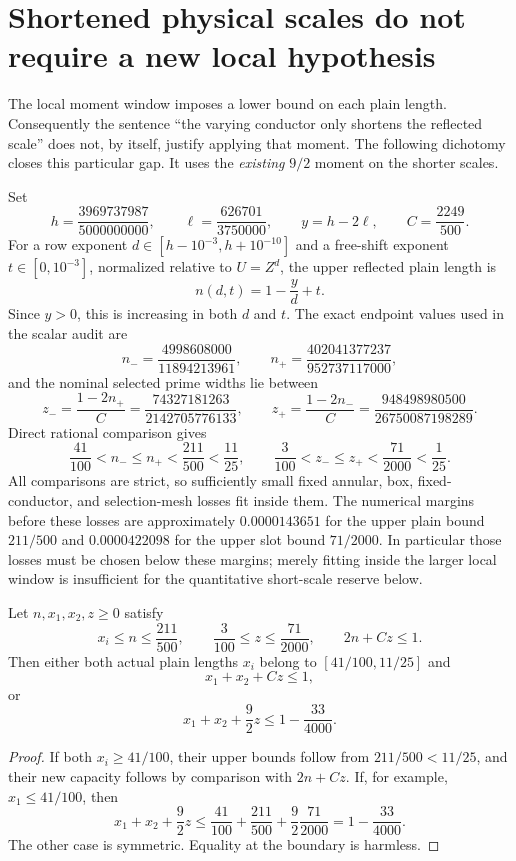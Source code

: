 \section{Shortened physical scales do not require a new local hypothesis}
\label{sec:physical-scale-shortening}

The local moment window imposes a lower bound on each plain length.
Consequently the sentence ``the varying conductor only shortens the
reflected scale'' does not, by itself, justify applying that moment.
The following dichotomy closes this particular gap. It uses the
\emph{existing} $9/2$ moment on the shorter scales.

Set
\[
 h=\frac{3969737987}{5000000000},\qquad
 \ell=\frac{626701}{3750000},\qquad y=h-2\ell,
 \qquad C=\frac{2249}{500}.
\]
For a row exponent $d\in[h-10^{-3},h+10^{-10}]$ and a free-shift
exponent $t\in[0,10^{-3}]$, normalized relative to $U=Z^d$, the
upper reflected plain length is
\[
 n(d,t)=1-\frac yd+t.
\]
Since $y>0$, this is increasing in both $d$ and $t$. The exact
endpoint values used in the scalar audit are
\[
 n_- =\frac{4998608000}{11894213961},\qquad
 n_+ =\frac{402041377237}{952737117000},
\]
and the nominal selected prime widths lie between
\[
 z_- =\frac{1-2n_+}{C}
      =\frac{74327181263}{2142705776133},\qquad
 z_+ =\frac{1-2n_-}{C}
      =\frac{948498980500}{26750087198289}.
\]
Direct rational comparison gives
\[
 \frac{41}{100}<n_-\le n_+<\frac{211}{500}<\frac{11}{25},
 \qquad
 \frac3{100}<z_-\le z_+<\frac{71}{2000}<\frac1{25}.
\]
All comparisons are strict, so sufficiently small fixed annular,
box, fixed-conductor, and selection-mesh losses fit inside them.
The numerical margins before these losses are approximately
$0.0000143651$ for the upper plain bound $211/500$ and
$0.0000422098$ for the upper slot bound $71/2000$.
In particular those losses must be chosen below these margins;
merely fitting inside the larger local window is insufficient for
the quantitative short-scale reserve below.

\begin{lemma}
Let $n,x_1,x_2,z\ge0$ satisfy
\[
 x_i\le n\le\frac{211}{500},\qquad
 \frac3{100}\le z\le\frac{71}{2000},\qquad
 2n+Cz\le1.
\]
Then either both actual plain lengths $x_i$ belong to
$[41/100,11/25]$ and
\[
 x_1+x_2+Cz\le1,
\]
or
\[
 x_1+x_2+\frac92z\le1-\frac{33}{4000}.
\]
\end{lemma}
\begin{proof}
If both $x_i\ge41/100$, their upper bounds follow from
$211/500<11/25$, and their new capacity follows by comparison
with $2n+Cz$.
If, for example, $x_1\le41/100$, then
\[
 x_1+x_2+\frac92z
 \le\frac{41}{100}+\frac{211}{500}
       +\frac92\frac{71}{2000}
 =1-\frac{33}{4000}.
\]
The other case is symmetric. Equality at the boundary is harmless.
\end{proof}

